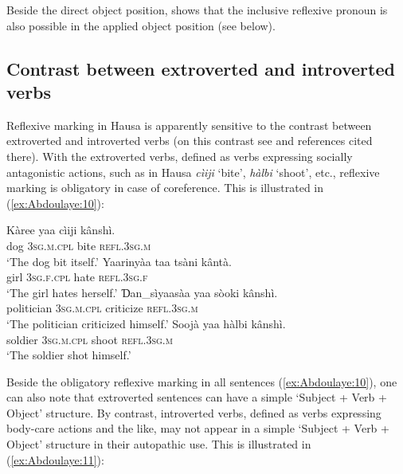 \documentclass[output=paper]{langscibook}
\begin{document}
Beside the direct object position, \citet[524]{Newman2000} shows that the inclusive reflexive pronoun is also possible in the applied object position (see  below).

\subsection{Contrast between extroverted and introverted verbs} \label{sec:Abdoulaye:3.3}

Reflexive marking in Hausa is apparently sensitive to the contrast between extroverted and introverted verbs (on this contrast see \citealt[44]{Haspelmath2008} and references cited there). With the extroverted verbs, defined as verbs expressing socially antagonistic actions, such as in Hausa \textit{cìiji} ‘bite’, \textit{hàlbi} ‘shoot’, etc., reflexive marking is obligatory in case of coreference. This is illustrated in (\ref{ex:Abdoulaye:10}):

\ea%
    \label{ex:Abdoulaye:10}
    \ea \label{ex:Abdoulaye:10a}
    \gll Kàree  yaa  cìiji  kânshì.\\
    dog  \textsc{3sg.m.cpl}  bite  \textsc{refl.3sg.m}\\
    \glt `The dog bit itself.’
    \ex \label{ex:Abdoulaye:10b}
   \gll Yaarinyàa  taa  tsàni  kântà.\\
    girl  \textsc{3sg.f.cpl}  hate  \textsc{refl.3sg.f}\\
    \glt `The girl hates herself.’
    \ex \label{ex:Abdoulaye:10c}
    \gll Ɗan\_sìyaasàa  yaa  sòoki  kânshì.\\
    politician  \textsc{3sg.m.cpl}  criticize  \textsc{refl.3sg.m}\\
    \glt `The politician criticized himself.’
    \ex \label{ex:Abdoulaye:10d}
    \gll Soojà  yaa  hàlbi  kânshì.\\
    soldier  \textsc{3sg.m.cpl}  shoot  \textsc{refl.3sg.m}\\
    \glt `The soldier shot himself.’
    \z
\z
  

Beside the obligatory reflexive marking in all sentences (\ref{ex:Abdoulaye:10}), one can also note that extroverted sentences can have a simple ‘Subject + Verb + Object’ structure. By contrast, introverted verbs, defined as verbs expressing body-care actions and the like, may not appear in a simple ‘Subject + Verb + Object’ structure in their autopathic use. This is illustrated in (\ref{ex:Abdoulaye:11}): 
\end{document}
